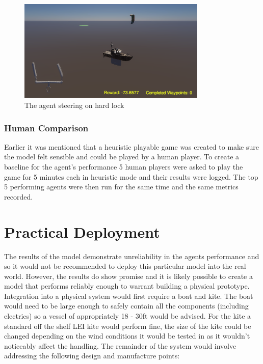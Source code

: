\begin{figure}[!htb]
    \centering
    \includegraphics[width=0.8\textwidth]{Images/hard_lock.png}
    \caption{The agent steering on hard lock}\label{hard_lock}
\end{figure}


\subsubsection{Human Comparison}\label{hcomp}
Earlier it was mentioned that a heuristic playable game was created to make sure the model felt sensible and could be played by a human player. To create a baseline for the agent's performance 5 human players were asked to play the game for 5 minutes each in heuristic mode and their results were logged. The top 5 performing agents were then run for the same time and the same metrics recorded. 

\section{Practical Deployment}\label{sec:practical_deployment}
The results of the model demonstrate unreliability in the agents performance and so it would not be recommended to deploy this particular model into the real world. However, the results do show promise and it is likely possible to create a model that performs reliably enough to warrant building a physical prototype. Integration into a physical system would first require a boat and kite. The boat would need to be large enough to safely contain all the components (including electrics) so a vessel of appropriately 18 - 30ft would be advised. For the kite a standard off the shelf LEI kite would perform fine, the size of the kite could be changed depending on the wind conditions it would be tested in as it wouldn't noticeably affect the handling. The remainder of the system would involve addressing the following design and manufacture points:  

